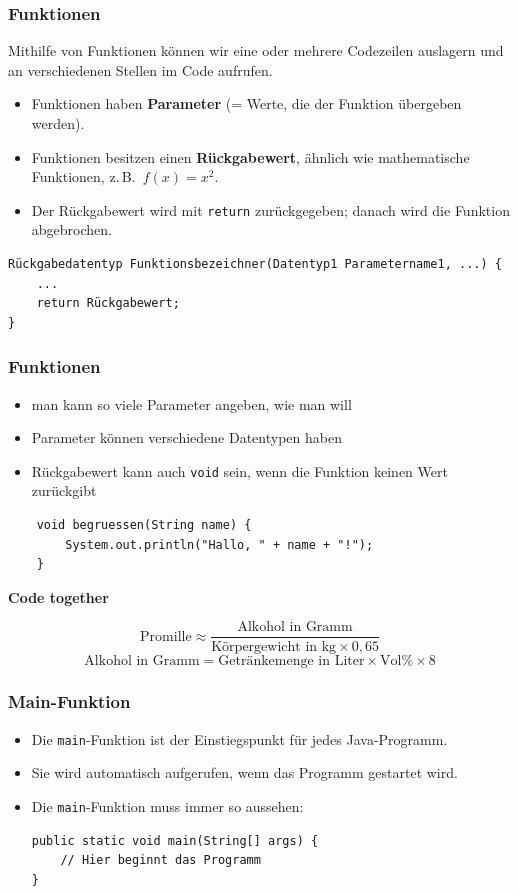 \documentclass{../../presentation}
\begin{document}
\begin{frame}[fragile]
	\frametitle{Funktionen}
	Mithilfe von Funktionen können wir eine oder mehrere Codezeilen auslagern und an verschiedenen Stellen im Code aufrufen.
	\begin{itemize}
		\item Funktionen haben \textbf{Parameter} (= Werte, die der Funktion übergeben werden).
		\item Funktionen besitzen einen \textbf{Rückgabewert}, ähnlich wie mathematische Funktionen, z.\,B.\ $f(x) = x^2$.
		\item Der Rückgabewert wird mit \texttt{return} zurückgegeben; danach wird die Funktion abgebrochen.
	\end{itemize}
	\begin{verbatim}
Rückgabedatentyp Funktionsbezeichner(Datentyp1 Parametername1, ...) {
    ...
    return Rückgabewert;
}
\end{verbatim}
\end{frame}

\begin{frame}[fragile]
	\frametitle{Funktionen}
	\begin{itemize}
		\item man kann so viele Parameter angeben, wie man will
		\item Parameter können verschiedene Datentypen haben
		\item Rückgabewert kann auch \texttt{void} sein, wenn die Funktion keinen Wert zurückgibt
	\end{itemize}
	\begin{verbatim}
    void begruessen(String name) {
        System.out.println("Hallo, " + name + "!");
    }
    \end{verbatim}
\end{frame}


\begin{frame}[plain]
	\centering
	{\Huge\bfseries{Code together}}
	\begin{block}{}
		\[
			\text{Promille} \approx \frac{\text{Alkohol in Gramm}}{\text{Körpergewicht in kg} \times 0{,}65}
		\]
		\[
			\text{Alkohol in Gramm} = \text{Getränkemenge in Liter} \times \text{Vol\%} \times 8
		\]
	\end{block}
\end{frame}

\begin{frame}[fragile]
	\frametitle{Main-Funktion}
	\begin{itemize}
		\item Die \texttt{main}-Funktion ist der Einstiegspunkt für jedes Java-Programm.
		\item Sie wird automatisch aufgerufen, wenn das Programm gestartet wird.
		\item Die \texttt{main}-Funktion muss immer so aussehen:
		      \begin{verbatim}
public static void main(String[] args) {
    // Hier beginnt das Programm
}
\end{verbatim}
	\end{itemize}
\end{frame}
\end{document}
